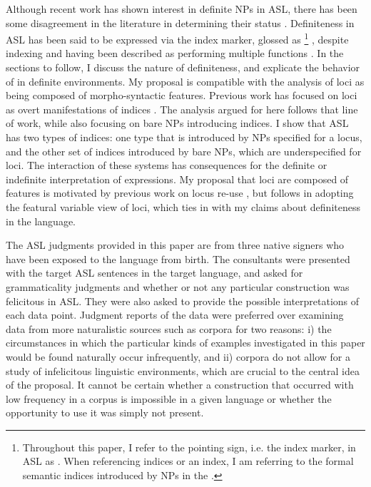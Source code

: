\documentclass[output=paper,
modfonts
]{langscibook}
\begin{document}
Although recent work has shown interest in definite NPs in ASL, there has been some disagreement in the literature in determining their status \citep{Bahanetal1995,KoulidobrovaLilloMartin2016}. Definiteness in ASL has been said to be expressed via the index marker, glossed as \footnote{Throughout this paper, I refer to the pointing sign, i.e. the index marker, in ASL as . When referencing indices or an index, I am referring to the formal semantic indices introduced by NPs in the .} \citep{Bahanetal1995}, despite indexing and  having been described as performing multiple functions \citep[e.g.][]{LilloMartinKlima1990}. In the sections to follow, I discuss the nature of definiteness, and explicate the behavior of  in definite environments. My proposal is compatible with the analysis of loci as being composed of morpho-syntactic features. Previous work has focused on loci as overt manifestations of indices . The analysis argued for here follows that line of work, while also focusing on bare NPs introducing indices. I show that ASL has two types of indices: one type that is introduced by NPs specified for a locus, and the other set of indices introduced by bare NPs, which are underspecified for loci. The interaction of these systems has consequences for the definite or indefinite interpretation of expressions. My proposal that loci are composed of features is motivated by previous work on locus re-use \citep{Kuhn2015}, but follows \citet{Schlenker2014} in adopting the featural variable view of loci, which ties in with my claims about definiteness in the language.

The ASL judgments provided in this paper are from three native signers who have been exposed to the language from birth. The consultants were presented with the target ASL sentences in the target language, and asked for grammaticality judgments and whether or not any particular construction was felicitous in ASL. They were also asked to provide the possible interpretations of each data point. Judgment reports of the data were preferred over examining data from more naturalistic sources such as corpora for two reasons: i) the circumstances in which the particular kinds of examples investigated in this paper would be found naturally occur infrequently, and ii) corpora do not allow for a study of infelicitous linguistic environments, which are crucial to the central idea of the proposal. It cannot be certain whether a construction that occurred with low frequency in a corpus is impossible in a given language or whether the opportunity to use it was simply not present.
\end{document}
